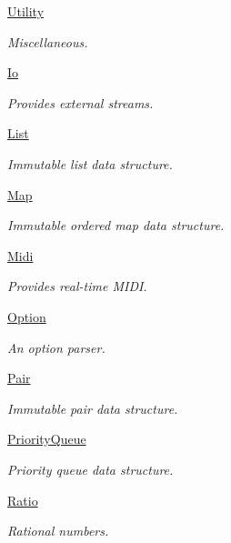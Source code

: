 \begin{DoxyCompactItemize}
\hyperlink{group___fa_utility}{Utility}
\begin{DoxyCompactList}\small\item\em Miscellaneous. \end{DoxyCompactList}\item 
\hyperlink{group___fa_io}{Io}
\begin{DoxyCompactList}\small\item\em Provides external streams. \end{DoxyCompactList}\item 
\hyperlink{group___fa_list}{List}
\begin{DoxyCompactList}\small\item\em Immutable list data structure. \end{DoxyCompactList}\item 
\hyperlink{group___fa_map}{Map}
\begin{DoxyCompactList}\small\item\em Immutable ordered map data structure. \end{DoxyCompactList}\item 
\hyperlink{group___fa_midi}{Midi}
\begin{DoxyCompactList}\small\item\em Provides real-\/time M\-I\-D\-I. \end{DoxyCompactList}\item 
\hyperlink{group___fa_option}{Option}
\begin{DoxyCompactList}\small\item\em An option parser. \end{DoxyCompactList}\item 
\hyperlink{group___fa_pair}{Pair}
\begin{DoxyCompactList}\small\item\em Immutable pair data structure. \end{DoxyCompactList}\item 
\hyperlink{group___fa_priority_queue}{Priority\-Queue}
\begin{DoxyCompactList}\small\item\em Priority queue data structure. \end{DoxyCompactList}\item 
\hyperlink{group___fa_ratio}{Ratio}
\begin{DoxyCompactList}\small\item\em Rational numbers. \end{DoxyCompactList}\item 

\end{DoxyCompactItemize}

